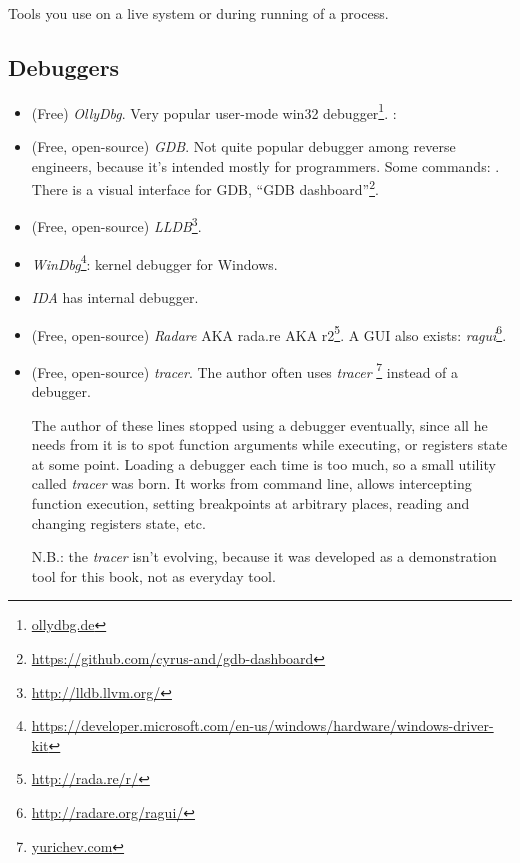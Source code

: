 
Tools you use on a live system or during running of a process.

\subsection{Debuggers}

\myindex{\olly}

\begin{itemize}
\item (Free) \emph{OllyDbg}.
Very popular user-mode win32 debugger\footnote{\href{http://go.yurichev.com/17032}{ollydbg.de}}.
\ShortHotKeyCheatsheet: 

\item (Free, open-source) \emph{GDB}.
Not quite popular debugger among reverse engineers, because it's intended mostly for programmers.
Some commands: .
There is a visual interface for GDB, ``GDB dashboard''\footnote{\url{https://github.com/cyrus-and/gdb-dashboard}}.

\item (Free, open-source) \emph{LLDB}\footnote{\url{http://lldb.llvm.org/}}.

\item \emph{WinDbg}\footnote{\url{https://developer.microsoft.com/en-us/windows/hardware/windows-driver-kit}}:
kernel debugger for Windows.

\item \emph{IDA} has internal debugger.

\item (Free, open-source) \emph{Radare} \ac{AKA} rada.re \ac{AKA} r2\footnote{\url{http://rada.re/r/}}.
A GUI also exists: \emph{ragui}\footnote{\url{http://radare.org/ragui/}}.

\item (Free, open-source) \emph{tracer}.
\label{tracer}
The author often uses \emph{tracer}
\footnote{\href{http://go.yurichev.com/17338}{yurichev.com}}
instead of a debugger.

The author of these lines stopped using a debugger eventually, since all he needs from it is to spot function arguments while
executing, or registers state at some point.
Loading a debugger each time is too much, so a small utility called \emph{tracer} was born.
It works from command line, allows intercepting function execution,
setting breakpoints at arbitrary places, reading and changing registers state, etc.

N.B.: the \emph{tracer} isn't evolving, because it was developed as a demonstration tool for this book, not as everyday tool.
\end{itemize}


